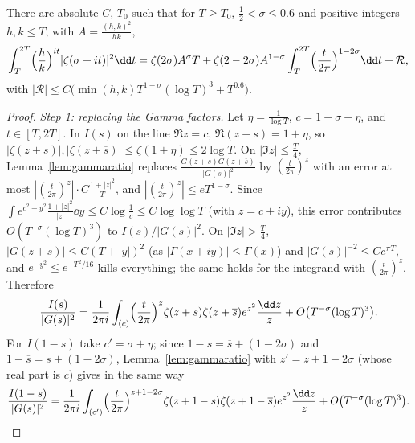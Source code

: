 \begin{theorem}\label{thm:twisted}
There are absolute $C$, $T_0$ such that for $T\ge T_0$, $\frac12<\sigma\le0.6$ and positive integers $h,k\le T$, with $A=\frac{(h,k)^2}{hk}$,
\[
\int_T^{2T}\Bigl(\frac hk\Bigr)^{it}|\zeta(\sigma+it)|^2\dd t=\zeta(2\sigma)A^\sigma T+\zeta(2-2\sigma)A^{1-\sigma}\int_T^{2T}\Bigl(\frac t{2\pi}\Bigr)^{1-2\sigma}\dd t+\mathcal R,
\]
with $|\mathcal R|\le C\bigl(\min(h,k)T^{1-\sigma}(\log T)^3+T^{0.6}\bigr)$.
\end{theorem}
\begin{proof}
\emph{Step 1: replacing the Gamma factors.} Let $\eta=\frac1{\log T}$, $c=1-\sigma+\eta$, and $t\in[T,2T]$. In $I(s)$ on the line $\Re z=c$, $\Re(z+s)=1+\eta$, so $|\zeta(z+s)|,|\zeta(z+\overline s)|\le\zeta(1+\eta)\le2\log T$. On $|\Im z|\le\frac T4$, Lemma~\ref{lem:gammaratio} replaces $\frac{G(z+s)G(z+\overline s)}{|G(s)|^2}$ by $(\frac t{2\pi})^z$ with an error at most $|(\frac t{2\pi})^z|\cdot C\frac{1+|z|^2}T$, and $|(\frac t{2\pi})^z|\le eT^{1-\sigma}$. Since $\int e^{c^2-y^2}\frac{1+|z|^2}{|z|}\dd y\le C\log\frac1c\le C\log\log T$ (with $z=c+iy$), this error contributes $O(T^{-\sigma}(\log T)^3)$ to $I(s)/|G(s)|^2$. On $|\Im z|>\frac T4$, $|G(z+s)|\le C(T+|y|)^2$ (as $|\Gamma(x+iy)|\le\Gamma(x)$) and $|G(s)|^{-2}\le Ce^{\pi T}$, and $e^{-y^2}\le e^{-T^2/16}$ kills everything; the same holds for the integrand with $(\frac t{2\pi})^z$. Therefore
\[
\frac{I(s)}{|G(s)|^2}=\frac1{2\pi i}\int_{(c)}\Bigl(\frac t{2\pi}\Bigr)^z\zeta(z+s)\zeta(z+\overline s)e^{z^2}\frac{\dd z}z+O\bigl(T^{-\sigma}(\log T)^3\bigr).
\]
For $I(1-s)$ take $c'=\sigma+\eta$; since $1-s=\overline s+(1-2\sigma)$ and $1-\overline s=s+(1-2\sigma)$, Lemma~\ref{lem:gammaratio} with $z'=z+1-2\sigma$ (whose real part is $c$) gives in the same way
\[
\frac{I(1-s)}{|G(s)|^2}=\frac1{2\pi i}\int_{(c')}\Bigl(\frac t{2\pi}\Bigr)^{z+1-2\sigma}\zeta(z+1-s)\zeta(z+1-\overline s)e^{z^2}\frac{\dd z}z+O\bigl(T^{-\sigma}(\log T)^3\bigr).
\]


\end{proof}
